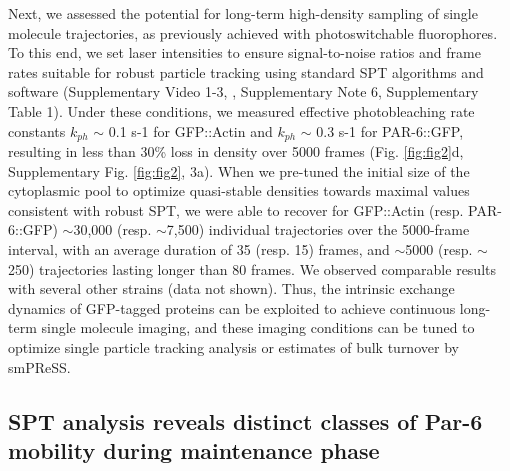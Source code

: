  
 Next, we assessed the potential for long-term high-density sampling of single molecule trajectories, as previously achieved with photoswitchable fluorophores. To this end, we set laser intensities to ensure signal-to-noise ratios and frame rates suitable for robust particle tracking using standard SPT algorithms and software (Supplementary Video 1-3, \cite{nmeth26,nmeth27}, Supplementary Note 6, Supplementary Table 1). Under these conditions, we measured effective photobleaching rate constants $k_{ph}$ $\sim$ 0.1 s-1 for GFP::Actin and $k_{ph}$ $\sim$ 0.3 s-1 for PAR-6::GFP, resulting in less than 30\% loss in density over 5000 frames (Fig. \ref{fig:fig2}d, Supplementary Fig. \ref{fig:fig2}, 3a). When we pre-tuned the initial size of the cytoplasmic pool to optimize quasi-stable densities towards maximal values consistent with robust SPT, we were able to recover for GFP::Actin (resp. PAR-6::GFP) $\sim$30,000 (resp. $\sim$7,500) individual trajectories over the 5000-frame interval, with an average duration of 35 (resp. 15) frames, and $\sim$5000 (resp. $\sim$250) trajectories lasting longer than 80 frames. We observed comparable results with several other strains (data not shown). Thus, the intrinsic exchange dynamics of GFP-tagged proteins can be exploited to achieve continuous long-term single molecule imaging, and these imaging conditions can be tuned to optimize single particle tracking analysis or estimates of bulk turnover by smPReSS.
 
 
 \subsection{SPT analysis reveals distinct classes of Par-6 mobility during maintenance phase}
 
